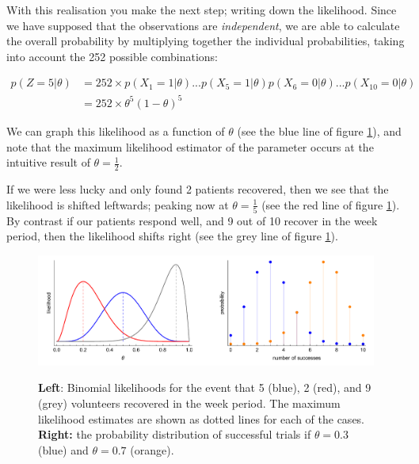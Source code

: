 \documentclass[11pt,fullpage]{book}
\begin{document}
With this realisation you make the next step; writing down the likelihood. Since we have supposed that the observations are \textit{independent}, we are able to calculate the overall probability by multiplying together the individual probabilities, taking into account the 252 possible combinations:

\begin{equation}
\begin{align}
p(Z=5|\theta) &= 252\times p(X_1=1|\theta) ... p(X_5=1|\theta) p(X_6=0|\theta) ... p(X_10=0|\theta)\\
&= 252\times \theta^5 (1-\theta)^5
\end{align}
\end{equation}

We can graph this likelihood as a function of $\theta$ (see the blue line of figure \ref{fig:Distributions_binomialClinicalTrial}), and note that the maximum likelihood estimator of the parameter occurs at the intuitive result of $\theta=\frac{1}{2}$.

If we were less lucky and only found 2 patients recovered, then we see that the likelihood is shifted leftwards; peaking now at $\theta=\frac{1}{5}$ (see the red line of figure \ref{fig:Distributions_binomialClinicalTrial}). By contrast if our patients respond well, and 9 out of 10 recover in the week period, then the likelihood shifts right (see the grey line of figure \ref{fig:Distributions_binomialClinicalTrial}).

\begin{figure}
\centering
\scalebox{0.5} 
{\includegraphics{Distributions_binomialClinicalTrial.pdf}}
\caption{\textbf{Left}: Binomial likelihoods for the event that 5 (blue), 2 (red), and 9 (grey) volunteers recovered in the week period. The maximum likelihood estimates are shown as dotted lines for each of the cases. \textbf{Right:} the probability distribution of successful trials if $\theta=0.3$ (blue) and $\theta=0.7$ (orange).}\label{fig:Distributions_binomialClinicalTrial}
\end{figure}
\end{document}
